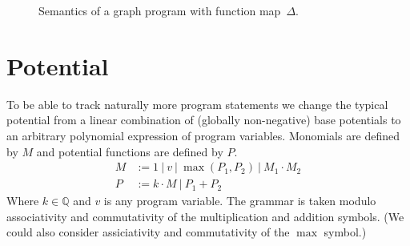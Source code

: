 \documentclass[nocopyrightspace,preprint]{sigplanconf-pldi15}
\begin{document}
\begin{figure}[ht]
\caption{Semantics of a graph program with function map~$\Delta$.}
\label{fig:sem}
\end{figure}

\section{Potential}

To be able to track naturally more program statements
we change the typical potential from a linear combination
of (globally non-negative) base potentials to an arbitrary
polynomial expression of program variables. Monomials are
defined by $M$ and potential functions are defined by $P$.
%
\begin{align*}
M &:= 1 ~\vert~ v ~\vert~ \max(P_1, P_2) ~\vert~ M_1 \cdot M_2 \\
P &:= k \cdot M ~\vert~ P_1 + P_2
\end{align*}
%
Where $k \in \mathbb Q$ and $v$ is any program variable.
The grammar is taken modulo associativity and commutativity
of the multiplication and addition symbols. (We could also
consider assiciativity and commutativity of the $\max$ symbol.)
\end{document}
